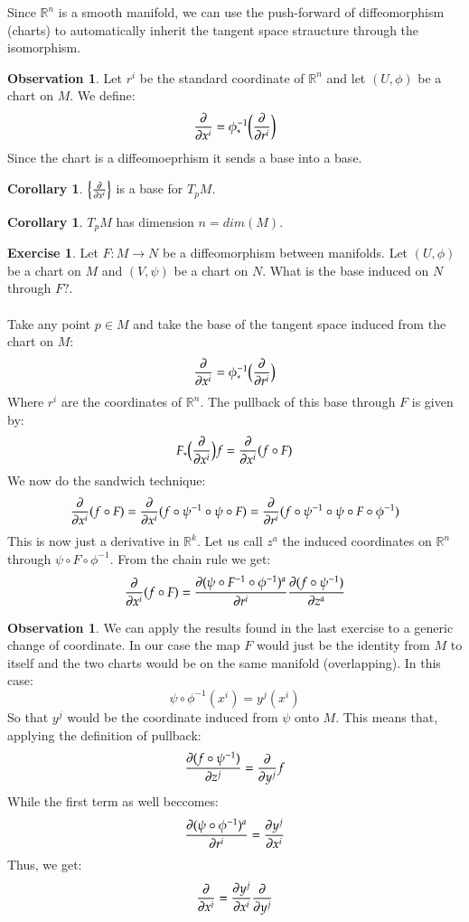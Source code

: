 \documentclass[12pt,a4paper]{report}
\theoremstyle{definition}
\theoremstyle{Theorem}
\theoremstyle{break}
\newtheorem{Exe}[Def]{Exercise}
\theoremstyle{definition}
\newtheorem{Cor}[Def]{Corollary}
\newtheorem{Obs}[Def]{Observation}
\begin{document}
			Since $\mathbb{R}^n$ is a smooth manifold, we can use the push-forward of diffeomorphism (charts) to automatically inherit the tangent space straucture through the isomorphism.
			\begin{Obs}
				Let $r^i$ be the standard coordinate of $\mathbb{R}^n$ and let $(U,\phi)$ be a chart on $M$. We define:
				$${\partial\over \partial x^i}=\phi_*^{-1}\bigg({\partial\over \partial r^i}\bigg)$$
				Since the chart is a diffeomoeprhism it sends a base into a base.
			\end{Obs}
			\begin{Cor}
				$\big\{{\partial\over \partial x^i}\big\}$ is a base for $T_pM$.
			\end{Cor}
			\begin{Cor}
				$T_pM$ has dimension $n=dim(M)$.
			\end{Cor}
			\begin{Exe}
				Let $F:M\rightarrow N$ be a diffeomorphism between manifolds. Let $(U,\phi)$ be a chart on $M$ and $(V,\psi)$ be a chart on $N$. What is the base induced on $N$ through $F?$.\\
				\\
				Take any point $p\in M$ and take the base of the tangent space induced from the chart on $M$:
				$${\partial \over \partial x^i}=\phi_*^{-1}\big({\partial\over \partial r^i}\big)$$
				Where $r^i$ are the coordinates of $\mathbb{R}^n$. The pullback of this base through $F$ is given by:
				$$F_*\big({\partial \over \partial x^i}\big)f={\partial \over \partial x^i}(f\circ F)$$
				We now do the sandwich technique:
				$${\partial \over \partial x^i}(f\circ F)={\partial \over \partial x^i}(f\circ\psi^{-1}\circ \psi \circ F)={\partial \over \partial r^i}(f\circ\psi^{-1}\circ \psi \circ F\circ \phi^{-1})$$
				This is now just a derivative in $\mathbb{R}^k$. Let us call $z^a$ the induced coordinates on $\mathbb{R}^n$ through $\psi\circ F\circ\phi^{-1}$. From the chain rule we get:
				$${\partial \over \partial x^i}(f\circ F)={\partial (\psi\circ F^{-1}\circ \phi^{-1})^a\over \partial r^i}{\partial (f\circ \psi^{-1})\over \partial z^a}$$
			\end{Exe}
			\begin{Obs}
				We can apply the results found in the last exercise to a generic change of coordinate. In our case the map $F$ would just be the identity from $M$ to itself and the two charts would be on the same manifold (overlapping). In this case:
				$$\psi\circ\phi^{-1}(x^i)=y^j(x^i)$$
				So that $y^j$ would be the coordinate induced from $\psi$ onto $M$. This means that, applying the definition of pullback:
				$${\partial (f\circ \psi^{-1})\over \partial z^j}={\partial\over \partial y^j}f$$
				While the first term as well beccomes:
				$${\partial (\psi\circ \phi^{-1})^a\over \partial r^i}={\partial y^j\over \partial x^i}$$
				Thus, we get:
				$${\partial \over \partial x^i}={\partial y^j\over \partial x^i}{\partial\over \partial y^j}$$
			\end{Obs}
\end{document}
